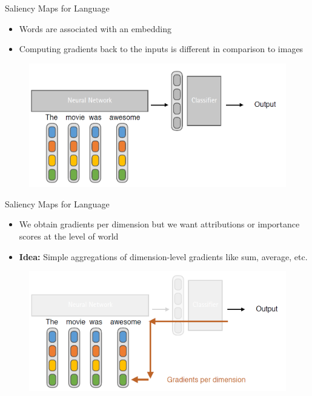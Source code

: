 \documentclass[11pt,compress,t,notes=noshow, aspectratio=169, xcolor=table]{beamer}
\begin{document}
\begin{frame}{Saliency Maps for Language}
    \begin{itemize}
        \item Words are associated with an embedding
        \item Computing gradients back to the inputs is different in comparison to images
    \end{itemize}
    \begin{figure}
        \centering
        \includegraphics[scale=.4]{bild17}
    \end{figure}
\end{frame}


\begin{frame}{Saliency Maps for Language}
    \begin{itemize}
        \item We obtain gradients per dimension but we want attributions or importance scores at
the level of world
        \item \textbf{Idea:} Simple aggregations of dimension-level gradients like sum, average, etc.
    \end{itemize}
    \begin{figure}
        \centering
        \includegraphics[scale=.4]{bild18}
    \end{figure}
\end{frame}
\end{document}

